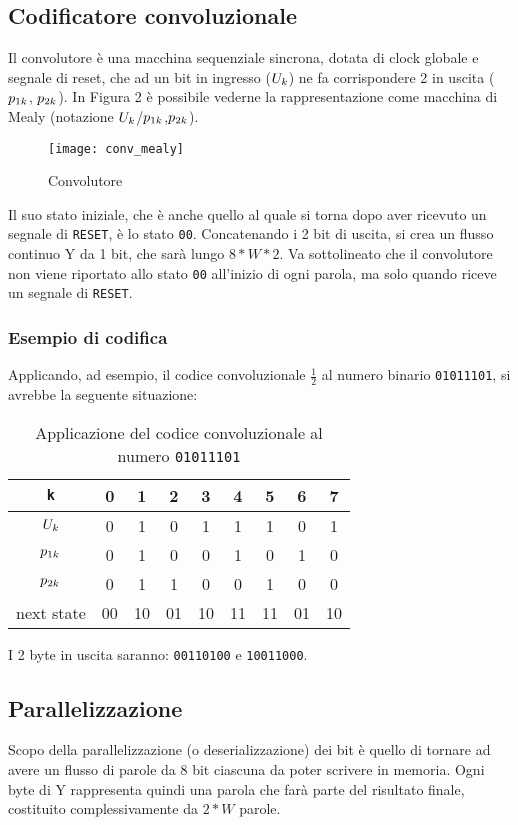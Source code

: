 \documentclass{article}
\begin{document}
\subsection{Codificatore convoluzionale}
Il convolutore è una macchina sequenziale sincrona, dotata di clock globale e segnale di reset, che ad un bit in ingresso ($U_{\small{k}}$) ne fa corrispondere 2 in uscita ($p_{\small{1k}}$, $p_{\small{2k}}$).
In Figura 2 è possibile vederne la rappresentazione come macchina di Mealy (notazione $U_{\small{k}}$/$p_{\small{1k}}$,$p_{\small{2k}}$).
\begin{figure}[H]
    \centering
    \texttt{[image: conv\_mealy]}
    \caption{Convolutore}
    \label{fig:conv_mealy}
\end{figure}
Il suo stato iniziale, che è anche quello al quale si torna dopo aver ricevuto un segnale di \verb^RESET^, è lo stato \verb^00^.
Concatenando i 2 bit di uscita, si crea un flusso continuo Y da 1 bit, che sarà lungo $8*W*2$.
Va sottolineato che il convolutore non viene riportato allo stato \verb^00^ all'inizio di ogni parola, ma solo quando riceve un segnale di \verb^RESET^.

\subsubsection{Esempio di codifica}
Applicando, ad esempio, il codice convoluzionale $\frac{1}{2}$ al numero binario \verb^01011101^, si avrebbe la seguente situazione:
\begin{table}[H]
    \centering
    \begin{tabular}{ c | c c c c c c c c } 
    \hline
    \verb^k^ & 0 & 1 & 2 & 3 & 4 & 5 & 6 & 7 \\
    \hline
    $U_{\small{k}}$ & 0 & 1 & 0 & 1 & 1 & 1 & 0 & 1 \\
    $p_{\small{1k}}$ & 0 & 1 & 0 & 0 & 1 & 0 & 1 & 0 \\
    $p_{\small{2k}}$ & 0 & 1 & 1 & 0 & 0 & 1 & 0 & 0 \\
    next state & 00 & 10 & 01 & 10 & 11 & 11 & 01 & 10 \\
    \end{tabular}
    \caption{Applicazione del codice convoluzionale al numero \verb^01011101^}
\end{table}
I 2 byte in uscita saranno: \verb^00110100^ e \verb^10011000^.

\subsection{Parallelizzazione}
Scopo della parallelizzazione (o deserializzazione) dei bit è quello di tornare ad avere un flusso di parole da 8 bit ciascuna da poter scrivere in memoria.
Ogni byte di Y rappresenta quindi una parola che farà parte del risultato finale, costituito complessivamente da $2*W$ parole.
\end{document}
